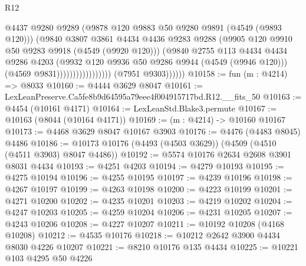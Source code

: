 \begin{lexlean}{R12}
\begin{coremodule}
                                          @4437
                                          @9280
                                          @9289
                                          (@9878 @120 @9883 @50 @9280 @9891 (@4549 (@9893 @120)))
                                          (@9840
                                            @3807
                                            @3861
                                            @4434
                                            @4436
                                            @9283
                                            @9288
                                            (@9905 @120 @9910 @50 @9283 @9918 (@4549 (@9920 @120)))
                                            (@9840
                                              @2755
                                              @113
                                              @4434
                                              @4434
                                              @9286
                                              @4203
                                              (@9932
                                                @120
                                                @9936
                                                @50
                                                @9286
                                                @9944
                                                (@4549 (@9946 @120)))
                                              (@4569 @9831)))))))))))))))))
              (@7951 @9303))))))
@10158 := fun (m : @4214) => @8033
@10160 := @4444 @3629 @8047
@10161 := LexLeanPreserve.Ca5fe8b9d64595a79eee4f004915717bd.R12.__fits_50
@10163 := @4454 (@10161 @4171)
@10164 := LexLeanStd.Blake3.permute
@10167 := @10163 (@8044 (@10164 @4171))
@10169 := (m : @4214) -> @10160 @10167
@10173 := @4468 @3629 @8047 @10167 @3903
@10176 := @4476 (@4483 @8045) @4486
@10186 := @10173 @10176 (@4493 (@4503 @3629)) (@4509 (@4510 (@4511 @3903) @8047 @4486))
@10192 := @5574 @10176 @2634 @2608 @3901 @8031 @4434
@10193 := @4251 @4203
@10194 := @4279 @10193
@10195 := @4275 @10194
@10196 := @4255 @10195
@10197 := @4239 @10196
@10198 := @4267 @10197
@10199 := @4263 @10198
@10200 := @4223 @10199
@10201 := @4271 @10200
@10202 := @4235 @10201
@10203 := @4219 @10202
@10204 := @4247 @10203
@10205 := @4259 @10204
@10206 := @4231 @10205
@10207 := @4243 @10206
@10208 := @4227 @10207
@10211 := @10192 @10208 (@4168 @10208)
@10212 := @4535 @10176
@10218 := @10212 @2642 @3900 @4434 @8030 @4226 @10207
@10221 := @8210 @10176 @135 @4434
@10225 := @10221 @103 @4295 @50 @4226

\end{coremodule}
\end{lexlean}
